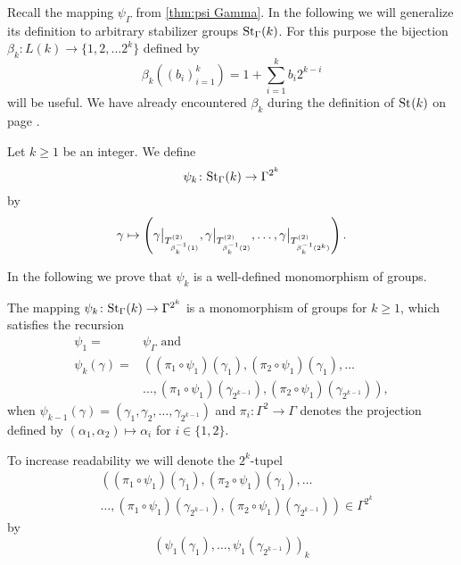 Recall the mapping $\psi_\Gamma$ from \cref{thm:psi Gamma}. In the following we will generalize its definition to arbitrary stabilizer groups $\St[\Gamma]{k}$. For this purpose the bijection $\beta_k\colon L(k)\to\lbrace 1,2,\ldots 2^k\rbrace$ defined by
\begin{equation*}
\beta_k\left((b_i)_{i=1}^k\right)=1+\sum_{i=1}^{k} b_{i}2^{k-i}
\end{equation*}
will be useful. We have already encountered $\beta_k$ during the definition of $\St{k}$ on page \pageref{def:Stabilizer Group}.
\begin{defin}
Let $k\geq 1$ be an integer. We define
\[ \psi_k\colon\St[\Gamma]{k}\to\Gamma^{2^k} \]
by
\begin{equation*}
\gamma\mapsto\left(\gamma\big\vert_{\ST{\beta_k^{-1}(1)}},\gamma\big\vert_{\ST{\beta_k^{-1}(2)}},\ldots,\gamma\big\vert_{\ST{\beta_k^{-1}(2^k)}}\right).
\end{equation*}
\end{defin}
In the following we prove that $\psi_k$ is a well-defined monomorphism of groups.
\begin{thm}\label{thm:psi k}
The mapping $\psi_k\colon\St[\Gamma]{k}\to\Gamma^{2^k}$ is a monomorphism of groups for $k\geq1$, which satisfies the recursion
\begin{align}
\psi_1=&\psi_\Gamma\text{ and}\label{eq:psi1=psiGamma}\\
\psi_k(\gamma)=&\left((\pi_1\circ\psi_1)(\gamma_1),(\pi_2\circ\psi_1)(\gamma_1),\ldots\right.\\
	&\left.\ldots,(\pi_1\circ\psi_1)(\gamma_{2^{k-1}}),(\pi_2\circ\psi_1)(\gamma_{2^{k-1}})\right),\nonumber
\end{align}
when $\psi_{k-1}(\gamma)=(\gamma_1,\gamma_2,\ldots,\gamma_{2^{k-1}})$ and $\pi_i\colon\Gamma^2\to\Gamma$ denotes the projection defined by $(\alpha_1,\alpha_2)\mapsto\alpha_i$ for $i\in\lbrace 1,2\rbrace$.
\end{thm}
To increase readability we will denote the $2^k$-tupel
\begin{align*}
&\left((\pi_1\circ\psi_1)(\gamma_1),(\pi_2\circ\psi_1)(\gamma_1),\ldots\right.\\
&\left.\ldots,(\pi_1\circ\psi_1)(\gamma_{2^{k-1}}),(\pi_2\circ\psi_1)(\gamma_{2^{k-1}})\right)\in\Gamma^{2^k}
\end{align*}
by 
\begin{equation}\label{eq:Notation for projections}
\left(\psi_1(\gamma_1),\ldots,\psi_1(\gamma_{2^{k-1}})\right)_k
\end{equation}
